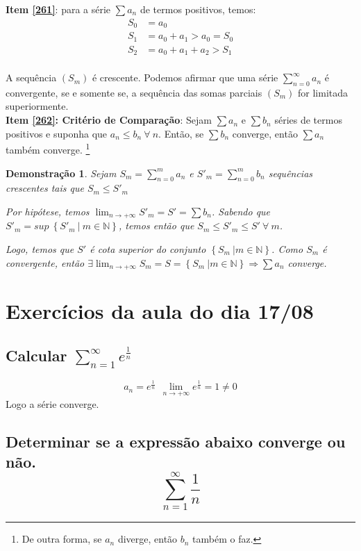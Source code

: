 \documentclass[12pt,openany, letterpaper]{book}
\newtheorem{demonstration}{Demonstração}
\begin{document}
\textbf{Item \ref{261}}: para a série $\sum a_n$ de termos positivos, temos:
\begin{align*}
S_0 &= a_0 \\
S_1 &= a_0 + a_1 > a_0 = S_0 \\
S_2 &= a_0 + a_1 + a_2 > S_1 \\
\end{align*}

A sequência $(S_m)$ é crescente. Podemos afirmar que uma série $\displaystyle{\sum_{n=0}^{\infty} a_n}$ é convergente, se e somente se, a sequência das somas parciais $(S_m)$ for limitada superiormente. \\

\textbf{Item \ref{262}: Critério de Comparação}: Sejam $\sum a_n$ e $\sum b_n$ séries de termos positivos e suponha que $a_n \leq b_n \ \forall \ n$. Então, se $\sum b_n$ converge, então $\sum a_n$ também converge. \footnote{De outra forma, se $a_n$ diverge, então $b_n$ também o faz.}

\begin{demonstration}
Sejam $\displaystyle{S_m = \sum_{n=0}^{m} a_n}$ e  $\displaystyle{S'_m = \sum_{n=0}^{m} b_n}$ sequências  crescentes tais que $S_m \leq S'_m$

Por hipótese, temos $\displaystyle{\lim_{n \rightarrow +\infty} S'_m = S' = \sum b_n}$. Sabendo que $S'_m = sup \ \left\{S'_m \ | \ m \in \mathds{N}\right\}$, temos então que $S_m \leq S'_m \leq S' \ \forall \ m$.

Logo, temos que $S'$ é cota superior do conjunto $\left\{S_m \ | m \in \mathds{N}\right\}$. Como $S_m$ é convergente, então $\displaystyle{\exists \lim_{n \rightarrow + \infty} S_m = S = \left\{S_m \ | m \in \mathds{N}\right\} \Rightarrow \sum a_n}$ converge. 
\end{demonstration}

\section{Exercícios da aula do dia 17/08}
\label{sec:s27}

\subsection*{Calcular $\displaystyle{\sum_{n=1}^{\infty} e^{\frac{1}{n}}} $}
$$ a_n = e^{\frac{1}{n}} \ \ \lim_{n \rightarrow +\infty} e^{\frac{1}{n}} = 1 \neq 0$$ Logo a série converge.

\subsection*{Determinar se a expressão abaixo converge ou não. $$\sum_{n=1}^{\infty} \frac{1}{n}$$}
\end{document}
